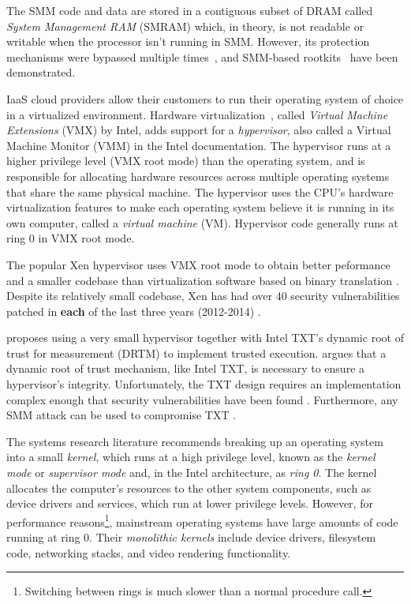 The SMM code and data are stored in a contiguous subset of DRAM called
\textit{System Management RAM} (SMRAM) which, in theory, is not readable or
writable when the processor isn't running in SMM. However, its protection
mechanisms were bypassed multiple times~\cite{duflot2006smm,
rutkowska2008remap, wojtczuk2009smm}, and SMM-based
rootkits~\cite{wecherowski2009smm, embleton2010smm} have been demonstrated.

IaaS cloud providers allow their customers to run their operating system of
choice in a virtualized environment. Hardware
virtualization~\cite{uhlig2005vmx}, called \textit{Virtual Machine Extensions}
(VMX) by Intel, adds support for a \textit{hypervisor}, also called a
Virtual Machine Monitor (VMM) in the Intel documentation. The hypervisor runs
at a higher privilege level (VMX root mode) than the operating system, and is
responsible for allocating hardware resources across multiple operating systems
that share the same physical machine. The hypervisor uses the CPU's hardware
virtualization features to make each operating system believe it is running in
its own computer, called a \textit{virtual machine} (VM). Hypervisor code
generally runs at ring 0 in VMX root mode.

The popular Xen hypervisor uses VMX root mode to obtain better peformance and a
smaller codebase \cite{zhang2008xen} than virtualization software based on
binary translation \cite{rosenblum2005virtualization}. Despite its relatively
small codebase, Xen has had over 40 security vulnerabilities patched in
\textbf{each} of the last three years (2012-2014) \cite{cvedetails2014xen}.

\cite{mccune2010trustvisor} proposes using a very small hypervisor together
with Intel TXT's dynamic root of trust for measurement (DRTM) to implement
trusted execution. \cite{vasudevan2010requirements} argues that a dynamic root
of trust mechanism, like Intel TXT, is necessary to ensure a hypervisor's
integrity.  Unfortunately, the TXT design requires an implementation complex
enough that security vulnerabilities have been found \cite{wojtczuk2009txt2}
\cite{wojtczuk2011txt}. Furthermore, any SMM attack can be used to compromise
TXT \cite{wojtczuk2009txt}.

The systems research literature recommends breaking up an operating system into
a small \textit{kernel}, which runs at a high privilege level, known as the
\textit{kernel mode} or \textit{supervisor mode} and, in the Intel
architecture, as \textit{ring 0}. The kernel allocates the computer's resources
to the other system components, such as device drivers and services, which run
at lower privilege levels. However, for performance reasons\footnote{Switching
between rings is much slower than a normal procedure call.}, mainstream
operating systems have large amounts of code running at ring 0. Their
\textit{monolithic kernels} include device drivers, filesystem code, networking
stacks, and video rendering functionality.

